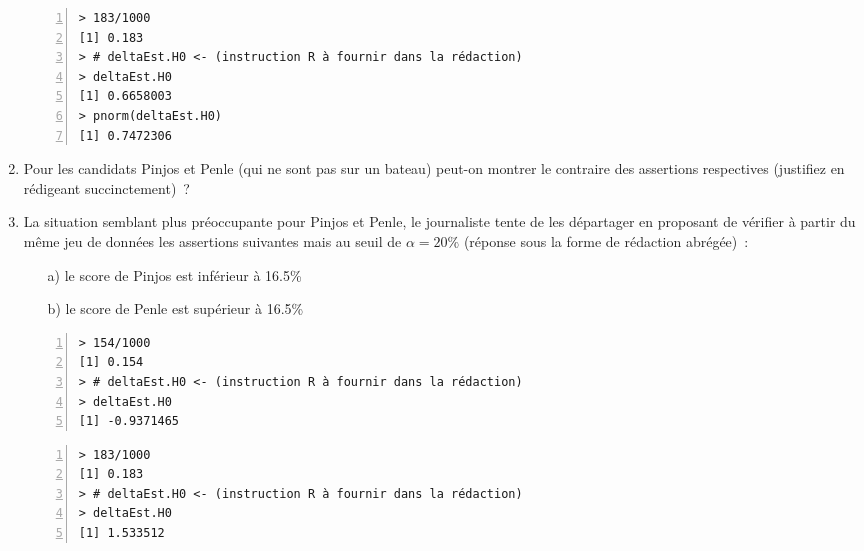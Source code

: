 \documentclass[10pt]{report}
\begin{document}
\begin{exercice}
\begin{enumerate}
\begin{Verbatim}[frame=leftline,fontfamily=tt,fontshape=n,numbers=left]
> 183/1000
[1] 0.183
> # deltaEst.H0 <- (instruction R à fournir dans la rédaction)
> deltaEst.H0
[1] 0.6658003
> pnorm(deltaEst.H0)
[1] 0.7472306
\end{Verbatim}




\item Pour les candidats Pinjos et Penle (qui ne sont pas sur un bateau) peut-on montrer le contraire des assertions respectives (justifiez en rédigeant succinctement)~?


\item La situation semblant plus préoccupante pour Pinjos et Penle, le journaliste tente de les départager en proposant de vérifier à partir du même jeu de données les assertions suivantes mais au seuil de $\alpha=20\%$ (réponse sous la forme de rédaction abrégée)~:
\begin{itemize}
\item[a)] le score de Pinjos est inférieur à 16.5\%
\item[b)] le score de Penle est supérieur à 16.5\%
\end{itemize}






\IndicR
\begin{Verbatim}[frame=leftline,fontfamily=tt,fontshape=n,numbers=left]
> 154/1000
[1] 0.154
> # deltaEst.H0 <- (instruction R à fournir dans la rédaction)
> deltaEst.H0
[1] -0.9371465
\end{Verbatim}

\begin{Verbatim}[frame=leftline,fontfamily=tt,fontshape=n,numbers=left]
> 183/1000
[1] 0.183
> # deltaEst.H0 <- (instruction R à fournir dans la rédaction)
> deltaEst.H0
[1] 1.533512
\end{Verbatim}





\end{enumerate}

\end{exercice}
\end{document}
